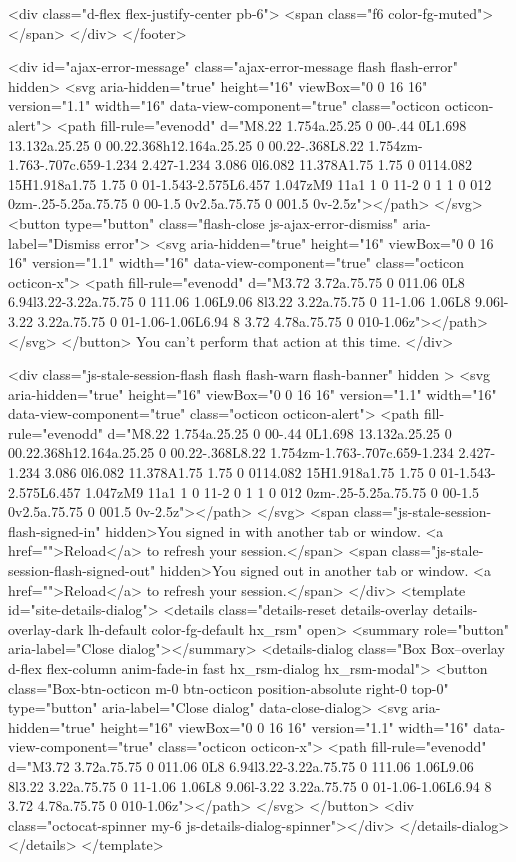   <div class="d-flex flex-justify-center pb-6">
    <span class="f6 color-fg-muted"></span>
  </div>
</footer>




  <div id="ajax-error-message" class="ajax-error-message flash flash-error" hidden>
    <svg aria-hidden="true" height="16" viewBox="0 0 16 16" version="1.1" width="16" data-view-component="true" class="octicon octicon-alert">
    <path fill-rule="evenodd" d="M8.22 1.754a.25.25 0 00-.44 0L1.698 13.132a.25.25 0 00.22.368h12.164a.25.25 0 00.22-.368L8.22 1.754zm-1.763-.707c.659-1.234 2.427-1.234 3.086 0l6.082 11.378A1.75 1.75 0 0114.082 15H1.918a1.75 1.75 0 01-1.543-2.575L6.457 1.047zM9 11a1 1 0 11-2 0 1 1 0 012 0zm-.25-5.25a.75.75 0 00-1.5 0v2.5a.75.75 0 001.5 0v-2.5z"></path>
</svg>
    <button type="button" class="flash-close js-ajax-error-dismiss" aria-label="Dismiss error">
      <svg aria-hidden="true" height="16" viewBox="0 0 16 16" version="1.1" width="16" data-view-component="true" class="octicon octicon-x">
    <path fill-rule="evenodd" d="M3.72 3.72a.75.75 0 011.06 0L8 6.94l3.22-3.22a.75.75 0 111.06 1.06L9.06 8l3.22 3.22a.75.75 0 11-1.06 1.06L8 9.06l-3.22 3.22a.75.75 0 01-1.06-1.06L6.94 8 3.72 4.78a.75.75 0 010-1.06z"></path>
</svg>
    </button>
    You can’t perform that action at this time.
  </div>

  <div class="js-stale-session-flash flash flash-warn flash-banner" hidden
    >
    <svg aria-hidden="true" height="16" viewBox="0 0 16 16" version="1.1" width="16" data-view-component="true" class="octicon octicon-alert">
    <path fill-rule="evenodd" d="M8.22 1.754a.25.25 0 00-.44 0L1.698 13.132a.25.25 0 00.22.368h12.164a.25.25 0 00.22-.368L8.22 1.754zm-1.763-.707c.659-1.234 2.427-1.234 3.086 0l6.082 11.378A1.75 1.75 0 0114.082 15H1.918a1.75 1.75 0 01-1.543-2.575L6.457 1.047zM9 11a1 1 0 11-2 0 1 1 0 012 0zm-.25-5.25a.75.75 0 00-1.5 0v2.5a.75.75 0 001.5 0v-2.5z"></path>
</svg>
    <span class="js-stale-session-flash-signed-in" hidden>You signed in with another tab or window. <a href="">Reload</a> to refresh your session.</span>
    <span class="js-stale-session-flash-signed-out" hidden>You signed out in another tab or window. <a href="">Reload</a> to refresh your session.</span>
  </div>
    <template id="site-details-dialog">
  <details class="details-reset details-overlay details-overlay-dark lh-default color-fg-default hx_rsm" open>
    <summary role="button" aria-label="Close dialog"></summary>
    <details-dialog class="Box Box--overlay d-flex flex-column anim-fade-in fast hx_rsm-dialog hx_rsm-modal">
      <button class="Box-btn-octicon m-0 btn-octicon position-absolute right-0 top-0" type="button" aria-label="Close dialog" data-close-dialog>
        <svg aria-hidden="true" height="16" viewBox="0 0 16 16" version="1.1" width="16" data-view-component="true" class="octicon octicon-x">
    <path fill-rule="evenodd" d="M3.72 3.72a.75.75 0 011.06 0L8 6.94l3.22-3.22a.75.75 0 111.06 1.06L9.06 8l3.22 3.22a.75.75 0 11-1.06 1.06L8 9.06l-3.22 3.22a.75.75 0 01-1.06-1.06L6.94 8 3.72 4.78a.75.75 0 010-1.06z"></path>
</svg>
      </button>
      <div class="octocat-spinner my-6 js-details-dialog-spinner"></div>
    </details-dialog>
  </details>
</template>

